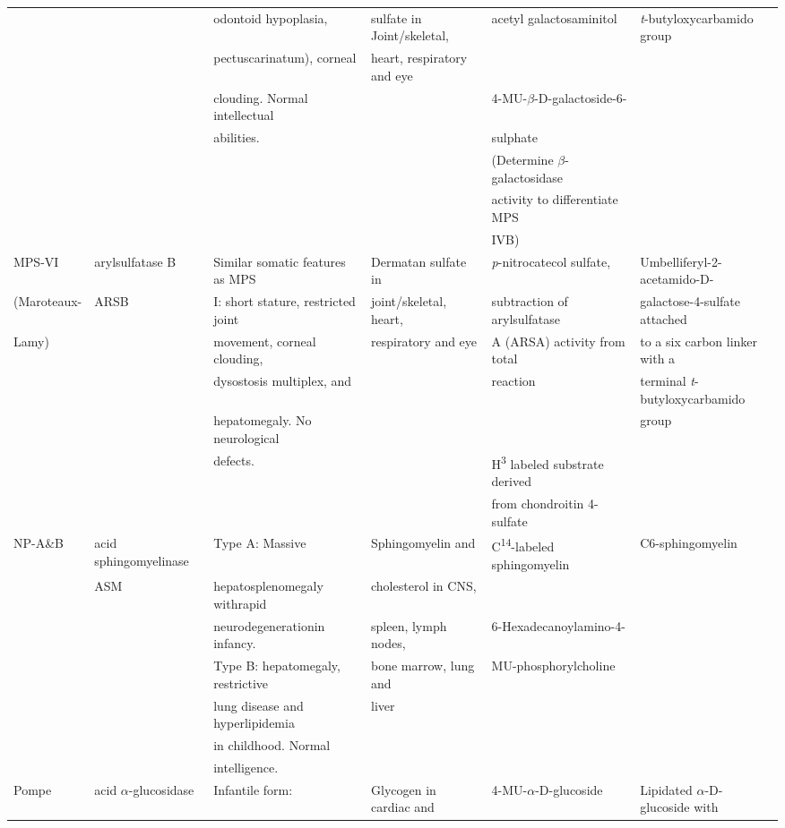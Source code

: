 \documentclass[landscape]{article}
\begin{document}
\begin{longtable}{llllll}
 &  & odontoid hypoplasia, & sulfate in Joint/skeletal, & acetyl galactosaminitol & \emph{t}-butyloxycarbamido group\\
 &  & pectuscarinatum), corneal & heart, respiratory and eye &  & \\
 &  & clouding. Normal intellectual &  & 4-MU-\(\beta\)-D-galactoside-6- & \\
 &  & abilities. &  & sulphate & \\
 &  &  &  & (Determine \(\beta\)-galactosidase & \\
 &  &  &  & activity to differentiate MPS & \\
 &  &  &  & IVB) & \\
\hline
MPS-VI & arylsulfatase B & Similar somatic features as MPS & Dermatan sulfate in & \emph{p}-nitrocatecol sulfate, & Umbelliferyl-2-acetamido-D-\\
(Maroteaux- & ARSB & I: short stature, restricted joint & joint/skeletal, heart, & subtraction of arylsulfatase & galactose-4-sulfate attached\\
Lamy) &  & movement, corneal clouding, & respiratory and eye & A (ARSA) activity from total & to a six carbon linker with a\\
 &  & dysostosis multiplex, and &  & reaction & terminal \emph{t}-butyloxycarbamido\\
 &  & hepatomegaly. No neurological &  &  & group\\
 &  & defects. &  & H\textsuperscript{3} labeled substrate derived & \\
 &  &  &  & from chondroitin 4-sulfate & \\
\hline
NP-A\&B & acid sphingomyelinase & Type A: Massive & Sphingomyelin and & C\textsuperscript{14}-labeled sphingomyelin & C6-sphingomyelin\\
 & ASM & hepatosplenomegaly withrapid & cholesterol in CNS, &  & \\
 &  & neurodegenerationin infancy. & spleen, lymph nodes, & 6-Hexadecanoylamino-4- & \\
 &  & Type B: hepatomegaly, restrictive & bone marrow, lung and & MU-phosphorylcholine & \\
 &  & lung disease and hyperlipidemia & liver &  & \\
 &  & in childhood. Normal &  &  & \\
 &  & intelligence. &  &  & \\
\hline
Pompe & acid \(\alpha\)-glucosidase & Infantile form: & Glycogen in cardiac and & 4-MU-\(\alpha\)-D-glucoside & Lipidated \(\alpha\)-D-glucoside with\\

\end{longtable}
\end{document}
